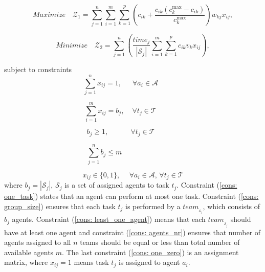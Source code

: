 \documentclass{sig-alternate}
\begin{document}
\begin{equation}\label{equ: quality-objective-overall}
  Maximize \quad \mathcal{Z}_1 = \sum_{j=1}^n\sum_{i=1}^m \sum_{k=1}^p (c_{ik} 
  + \frac{c_{ik}(c_k^{\max}-c_{ik})}{c_k^{\max}})w_{kj}x_{ij}, 
\end{equation}

\begin{equation}\label{equ: cost_objective_overall}
  Minimize \quad \mathcal{Z}_2 = \sum_{j=1}^n (\frac{time_j}{|\mathcal{S}_j|} 
  \sum_{i=1}^m \sum_{k=1}^p c_{ik}v_{k}x_{ij}), 
\end{equation}

subject to constraints
\begin{equation}\label{cons: one_task}
  \sum_{j=1}^n x_{ij} = 1, \hspace{18pt}  
  \forall a_i \in \mathcal{A} \hspace{41pt} 
\end{equation}

\begin{equation}\label{cons: group_size}
\sum_{i=1}^m x_{ij} = b_j,\hspace{13pt}
 \forall t_j \in \mathcal{T}\hspace{42pt} 
\end{equation}

\begin{equation}\label{cons: least_one_agent}
  b_j \geq 1, \hspace{37pt}  \forall t_j \in \mathcal{T} \hspace{41pt}
\end{equation}

\begin{equation}\label{cons: agents_nr}
  \sum_{j=1}^n b_j \leq m \hspace{96pt}
\end{equation}

\begin{equation}\label{cons: one_zero}
  x_{ij} \in \{0,1\}, \hspace{15pt} \forall a_i \in \mathcal{A},\, 
  \forall t_j \in \mathcal{T}
\end{equation}
where \mbox{$b_j=|\mathcal{S}_j|$}, $\mathcal{S}_j$ is a set of assigned 
agents to task $t_j$. Constraint (\ref{cons: one_task}) states that an agent 
can perform at most one task. Constraint (\ref{cons: group_size}) ensures that 
each task $t_j$ is performed by a $team_{_{\mathcal{S}_j}}$, which consists 
of $b_j$ agents. 
Constraint (\ref{cons: least_one_agent}) means that 
each $team_{_{\mathcal{S}_j}}$ should have at least one agent and 
constraint (\ref{cons: agents_nr}) ensures that number of agents assigned to 
all $n$ teams should be equal or less than total number of available 
agents $m$. The last constraint (\ref{cons: one_zero}) is an assignment matrix,
where $x_{ij}=1$ means task $t_j$ is assigned to agent $a_i$.
\end{document}
